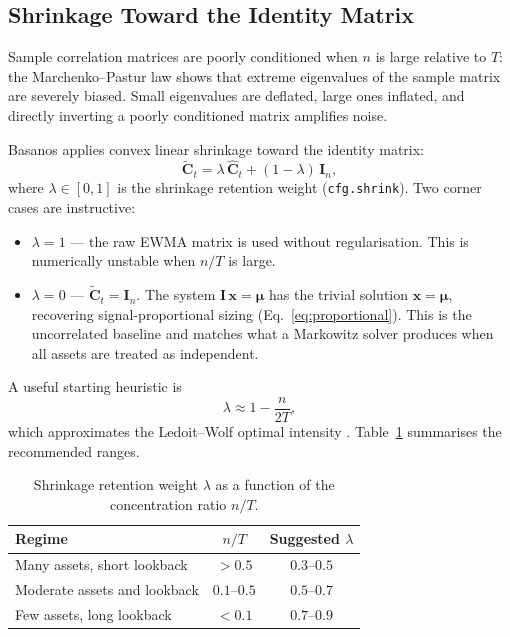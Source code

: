 \documentclass[11pt,a4paper]{article}
\newcommand{\C}{\mathbf{C}}
\newcommand{\I}{\mathbf{I}}
\newcommand{\x}{\mathbf{x}}
\newcommand{\muvec}{\bm{\mu}}
\begin{document}
\subsection{Shrinkage Toward the Identity Matrix}
\label{sec:shrinkage}

Sample correlation matrices are poorly conditioned when $n$ is large
relative to $T$: the Marchenko--Pastur law \citep{marchenko1967} shows that
extreme eigenvalues of the sample matrix are severely biased.  Small
eigenvalues are deflated, large ones inflated, and directly inverting a
poorly conditioned matrix amplifies noise.

Basanos applies convex linear shrinkage
\citep{ledoit2004} toward the identity matrix:
\begin{equation}
  \label{eq:shrinkage}
  \tilde{\C}_t = \lambda\,\hat{\C}_t + (1-\lambda)\,\I_n,
\end{equation}
where $\lambda \in [0,1]$ is the shrinkage retention weight
(\texttt{cfg.shrink}).  Two corner cases are instructive:

\begin{itemize}
  \item $\lambda = 1$ --- the raw EWMA matrix is used without regularisation.
    This is numerically unstable when $n/T$ is large.
  \item $\lambda = 0$ --- $\tilde{\C}_t = \I_n$.  The system $\I\,\x =
    \muvec$ has the trivial solution $\x = \muvec$, recovering
    signal-proportional sizing (Eq.~\eqref{eq:proportional}).  This is the
    uncorrelated baseline and matches what a Markowitz solver produces when all
    assets are treated as independent.
\end{itemize}

A useful starting heuristic is
\begin{equation}
  \lambda \approx 1 - \frac{n}{2T},
\end{equation}
which approximates the Ledoit--Wolf optimal intensity \citep{ledoit2004}.
Table~\ref{tab:shrinkage_guide} summarises the recommended ranges.

\begin{table}[h]
  \centering
  \caption{Shrinkage retention weight $\lambda$ as a function of the
           concentration ratio $n/T$.}
  \label{tab:shrinkage_guide}
  \begin{tabular}{lcc}
    \toprule
    \textbf{Regime} & $n / T$ & \textbf{Suggested $\lambda$} \\
    \midrule
    Many assets, short lookback   & $> 0.5$    & $0.3$--$0.5$ \\
    Moderate assets and lookback  & $0.1$--$0.5$ & $0.5$--$0.7$ \\
    Few assets, long lookback     & $< 0.1$    & $0.7$--$0.9$ \\
    \bottomrule
  \end{tabular}
\end{table}
\end{document}
